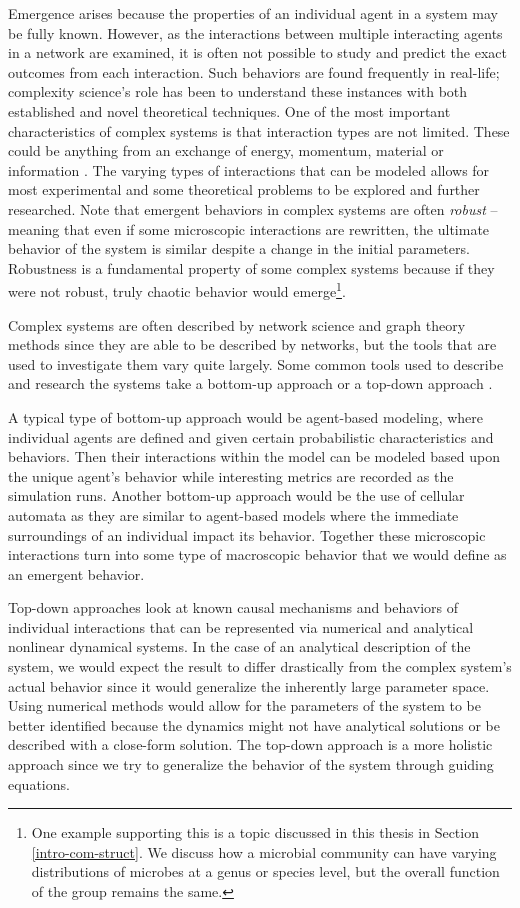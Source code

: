 Emergence arises because the properties of an individual agent in a system may be fully known. However, as the interactions between multiple interacting agents in a network are examined, it is often not possible to study and predict the exact outcomes from each interaction. Such behaviors are found frequently in real-life; complexity science's role has been to understand these instances with both established and novel theoretical techniques. One of the most important characteristics of complex systems is that interaction types are not limited. These could be anything from an exchange of energy, momentum, material or information \citep{Werner1999}. The varying types of interactions that can be modeled allows for most experimental and some theoretical problems to be explored and further researched. Note that emergent behaviors in complex systems are often \textit{robust} -- meaning that even if some microscopic interactions are rewritten, the ultimate behavior of the system is similar despite a change in the initial parameters. Robustness is a fundamental property of some complex systems because if they were not robust, truly chaotic behavior would emerge\footnote{One example supporting this is a topic discussed in this thesis in Section \ref{intro-com-struct}. We discuss how a microbial community can have varying distributions of microbes at a genus or species level, but the overall function of the group remains the same.}. 

Complex systems are often described by network science and graph theory methods since they are able to be described by networks, but the tools that are used to investigate them vary quite largely. Some common tools used to describe and research the systems take a bottom-up approach or a top-down approach \citep{Mhamdi2018}. 

A typical type of bottom-up approach would be agent-based modeling, where individual agents are defined and given certain probabilistic characteristics and behaviors. Then their interactions within the model can be modeled based upon the unique agent's behavior while interesting metrics are recorded as the simulation runs. Another bottom-up approach would be the use of cellular automata as they are similar to agent-based models where the immediate surroundings of an individual impact its behavior. Together these microscopic interactions turn into some type of macroscopic behavior that we would define as an emergent behavior.

Top-down approaches look at known causal mechanisms and behaviors of individual interactions that can be represented via numerical and analytical nonlinear dynamical systems. In the case of an analytical description of the system, we would expect the result to differ drastically from the complex system's actual behavior since it would generalize the inherently large parameter space. Using numerical methods would allow for the parameters of the system to be better identified because the dynamics might not have analytical solutions or be described with a close-form solution. The top-down approach is a more holistic approach since we try to generalize the behavior of the system through guiding equations.



